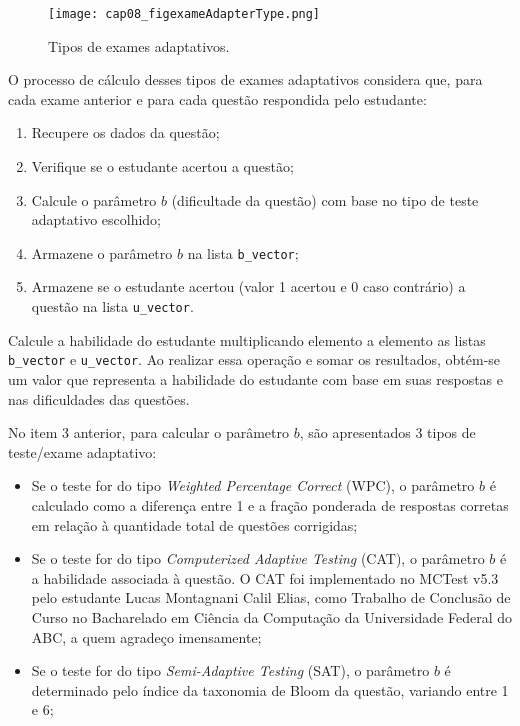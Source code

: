 \begin{figure}[!ht]
  \centering
  \texttt{[image: cap08\_figexameAdapterType.png]}
   \caption{Tipos de exames adaptativos.}
\label{fig:cap08_figexameAdapterType}
\end{figure}

O processo de cálculo desses tipos de exames adaptativos considera que, para cada exame anterior e para cada questão respondida pelo estudante:

\begin{enumerate}
    \item Recupere os dados da questão;
    \item Verifique se o estudante acertou a questão;
    \item Calcule o parâmetro $b$ (dificultade da questão) com base no tipo de teste adaptativo escolhido;
    \item Armazene o parâmetro $b$ na lista \verb|b_vector|;
    \item Armazene se o estudante acertou (valor 1 acertou e 0 caso contrário) a questão na lista \verb|u_vector|.
\end{enumerate}

Calcule a habilidade do estudante multiplicando elemento a elemento as listas \verb|b_vector| e \verb|u_vector|. Ao realizar essa operação e somar os resultados, obtém-se um valor que representa a habilidade do estudante com base em suas respostas e nas dificuldades das questões.

No item 3 anterior, para calcular o parâmetro $b$, são apresentados 3 tipos de teste/exame adaptativo:

\begin{itemize}
  \item Se o teste for do tipo \textit{Weighted Percentage Correct} (WPC), o parâmetro $b$ é calculado como a diferença entre 1 e a fração ponderada de respostas corretas em relação à quantidade total de questões corrigidas;
  \item Se o teste for do tipo \textit{Computerized Adaptive Testing} (CAT), o parâmetro $b$ é a habilidade associada à questão. O CAT foi implementado no MCTest v5.3 pelo estudante Lucas Montagnani Calil Elias, como Trabalho de Conclusão de Curso no Bacharelado em Ciência da Computação da Universidade Federal do ABC, a quem agradeço imensamente;
    \item Se o teste for do tipo \textit{Semi-Adaptive Testing} (SAT), o parâmetro $b$ é determinado pelo índice da taxonomia de Bloom da questão, variando entre 1 e 6;
\end{itemize}

